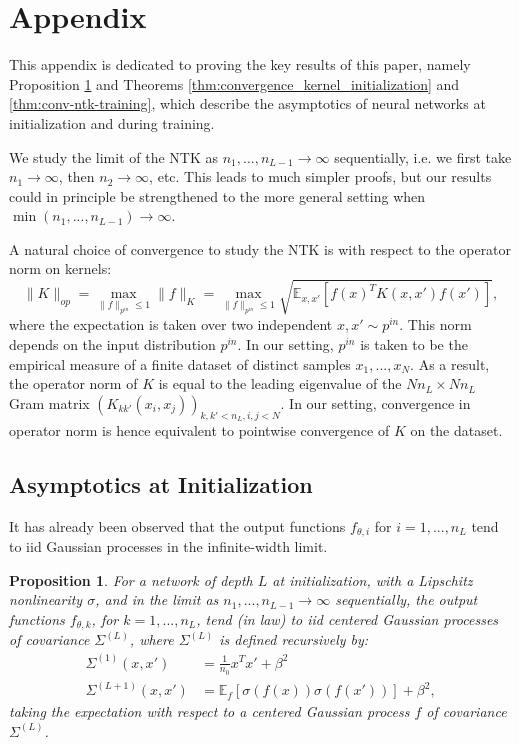 \documentclass{article}
\newtheorem{prop}{Proposition}
\begin{document}






\appendix
\setcounter{prop}{0}
\setcounter{thm}{0}
\section{Appendix} \label{sec:proofs}
This appendix is dedicated to proving the key results of this paper, namely Proposition \ref{prop:output_limit} and Theorems \ref{thm:convergence_kernel_initialization} and \ref{thm:conv-ntk-training}, which describe the asymptotics of neural networks at initialization and during training. 

We study the limit of the NTK as $n_1, ..., n_{L-1} \to \infty$ sequentially, i.e. we first take $n_1 \to \infty$, then $n_2 \to \infty $, etc. This leads to much simpler proofs, but our results could in principle be strengthened to the more general setting when $\min(n_1, ..., n_{L-1}) \to \infty$.

A natural choice of convergence to study the NTK is with respect to the operator norm on kernels:
$$
\lVert K \rVert_{op} = \max_{\lVert f \rVert_{p^{in}} \leq 1} \lVert f \rVert_K = \max_{\lVert f \rVert_{p^{in}} \leq 1}\sqrt {\mathbb{E}_{x, x'}[f(x)^T K(x, x')f(x')]},
$$
where the expectation is taken over two independent $x, x' \sim p^{in}$. This norm depends on the input distribution $p^{in}$. In our setting, $p^{in}$ is taken to be the empirical measure of a finite dataset of distinct samples $x_1, ..., x_N$. As a result, the operator norm of $K$ is equal to the leading eigenvalue of the $N n_L \times N n_L$ Gram matrix $\left( K_{kk'}(x_i, x_j)\right)_{k, k' < n_L, i, j < N}$. In our setting, convergence in operator norm is hence equivalent to pointwise convergence of $ K $ on the dataset. 


\subsection{Asymptotics at Initialization}
It has already been observed \citep{Neal1996, Lee2017} that the output functions $f_{\theta, i}$ for $i=1, ..., n_L$ tend to iid Gaussian processes in the infinite-width limit. 

\begin{prop}\label{prop:output_limit}
For a network of depth $L$ at initialization, with a Lipschitz nonlinearity $\sigma$, and in the limit as $n_1, ..., n_{L-1} \to \infty$ sequentially, the output functions $f_{\theta, k}$, for $k=1, ..., n_L$, tend  (in law) to iid centered Gaussian processes of covariance $\Sigma^{(L)}$, where $\Sigma^{(L)}$ is defined recursively by:
\begin{align*}
\Sigma^{(1)}(x, x') &= \frac{1}{n_0} x^T x' + \beta^2 \\
\Sigma^{(L+1)}(x, x') &= \mathbb{E}_{f}[\sigma(f(x)) \sigma(f(x'))] + \beta^2,
\end{align*}
taking the expectation with respect to a centered Gaussian process $f$ of covariance $\Sigma^{(L)}$.
\end{prop}
\end{document}
